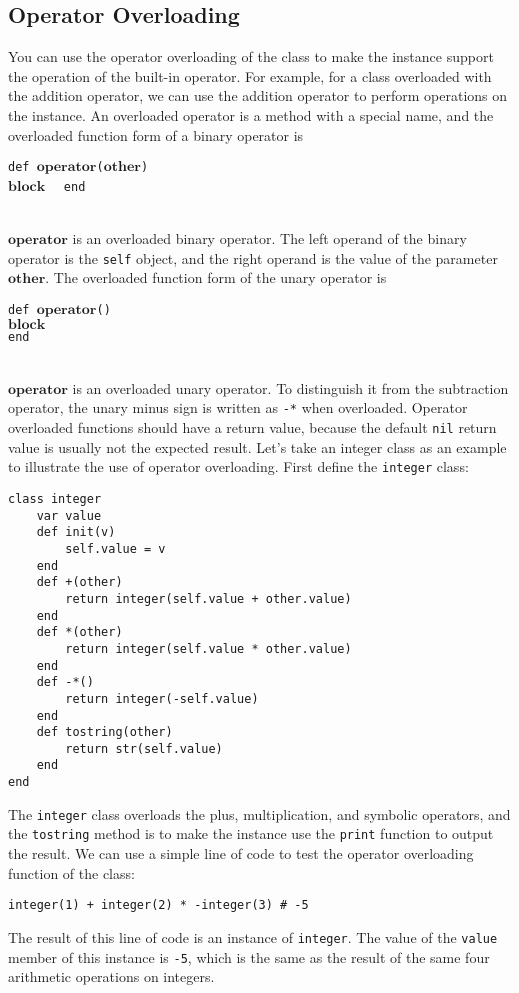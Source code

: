 \subsection {Operator Overloading}You can use the operator overloading of the class to make the instance support the operation of the built-in operator. For example, for a class overloaded with the addition operator, we can use the addition operator to perform operations on the instance. An overloaded operator is a method with a special name, and the overloaded function form of a binary operator is
\begin{algorithm}
    \texttt{def }$\bm{operator}$\texttt{(}$\bm{other}$\texttt{)}\\
    \qquad $\bm{block}$ \ \
    \texttt{end}
\end{algorithm}\vspace{-0.6em}\\
$\bm{operator}$ is an overloaded binary operator. The left operand of the binary operator is the \texttt{self} object, and the right operand is the value of the parameter $\bm{other}$. The overloaded function form of the unary operator is
\begin{algorithm}
    \texttt{def }$\bm{operator}$\texttt{()}\\
    \qquad $\bm{block}$ \\
    \texttt{end}
\end{algorithm}\vspace{-0.6em}\\
$\bm{operator}$ is an overloaded unary operator. To distinguish it from the subtraction operator, the unary minus sign is written as \texttt{-*} when overloaded. Operator overloaded functions should have a return value, because the default \texttt{nil} return value is usually not the expected result. Let's take an integer class as an example to illustrate the use of operator overloading. First define the \texttt{integer} class:
\begin{lstlisting}[language=berry]
class integer
    var value
    def init(v)
        self.value = v
    end
    def +(other)
        return integer(self.value + other.value)
    end
    def *(other)
        return integer(self.value * other.value)
    end
    def -*()
        return integer(-self.value)
    end
    def tostring(other)
        return str(self.value)
    end
end
\end{lstlisting}
The \texttt{integer} class overloads the plus, multiplication, and symbolic operators, and the \texttt{tostring} method is to make the instance use the \texttt{print} function to output the result. We can use a simple line of code to test the operator overloading function of the class:
\begin{lstlisting}[language=berry, numbers=none]
integer(1) + integer(2) * -integer(3) # -5
\end{lstlisting}
The result of this line of code is an instance of \texttt{integer}. The value of the \texttt{value} member of this instance is \texttt{-5}, which is the same as the result of the same four arithmetic operations on integers.

